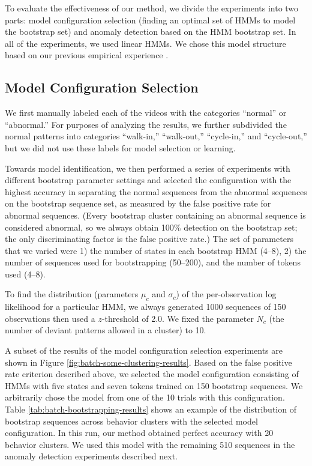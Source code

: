 To evaluate the effectiveness of our method, we divide the experiments
into two parts: model configuration selection (finding an optimal set
of HMMs to model the bootstrap set) and anomaly detection based on the
HMM bootstrap set. In all of the experiments, we used linear HMMs. We
chose this model structure based on our previous empirical
experience .

\subsection{Model Configuration Selection}
\label{sec:batch-model-config}

We first manually labeled each of the videos with the categories
``normal'' or ``abnormal.''  For purposes of analyzing the results, we
further subdivided the normal patterns into categories ``walk-in,''
``walk-out,'' ``cycle-in,'' and ``cycle-out,'' but we did not use
these labels for model selection or learning.

Towards model identification, we then performed a series of
experiments with different bootstrap parameter settings and selected
the configuration with the highest accuracy in separating the normal
sequences from the abnormal sequences on the bootstrap sequence set,
as measured by the false positive rate for abnormal sequences.  (Every
bootstrap cluster containing an abnormal sequence is considered
abnormal, so we always obtain 100\% detection on the bootstrap set;
the only discriminating factor is the false positive rate.)  The set
of parameters that we varied were 1) the number of states in each
bootstrap HMM (4--8), 2) the number of sequences used for
bootstrapping (50--200), and the number of tokens used (4--8).

To find the distribution (parameters $\mu_c$ and $\sigma_c$) of the
per-observation log likelihood for a particular HMM, we always
generated 1000 sequences of 150 observations then used a $z$-threshold
of 2.0. We fixed the parameter $N_c$ (the number of deviant patterns
allowed in a cluster) to 10.

A subset of the results of the model configuration selection
experiments are shown in
Figure \ref{fig:batch-some-clustering-results}. Based on the false
positive rate criterion described above, we selected the model
configuration consisting of HMMs with five states and seven tokens
trained on 150 bootstrap sequences.  We arbitrarily chose the model
from one of the 10 trials with this configuration.
Table \ref{tab:batch-bootstrapping-results} shows an example of the
distribution of bootstrap sequences across behavior clusters with the
selected model configuration. In this run, our method obtained perfect
accuracy with 20 behavior clusters.  We used this model with the
remaining 510 sequences in the anomaly detection experiments described
next.

